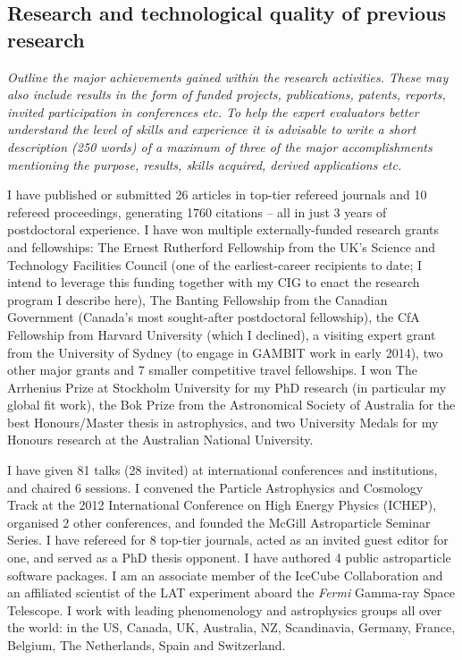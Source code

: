 \documentclass[a4paper,11pt]{article}
\newenvironment{xcomment}{\em}{}
\begin{document}
\subsection{Research and technological quality of previous research}

\begin{xcomment}
Outline the major achievements gained within the research
activities. These may also include results in the form of funded
projects, publications, patents, reports, invited participation in
conferences etc. To help the expert evaluators better understand the
level of skills and experience it is advisable to write a short
description (250 words) of a maximum of three of the major
accomplishments mentioning the purpose, results, skills acquired,
derived applications etc.
\end{xcomment}

I have published or submitted 26 articles in top-tier refereed journals and 10 refereed proceedings, generating 1760 citations -- all in just 3 years of postdoctoral experience.  I have won multiple externally-funded research grants and fellowships: The Ernest Rutherford Fellowship from the UK's Science and Technology Facilities Council (one of the earliest-career recipients to date; I intend to leverage this funding together with my CIG to enact the research program I describe here), The Banting Fellowship from the Canadian Government (Canada's most sought-after postdoctoral fellowship), the CfA Fellowship from Harvard University (which I declined), a visiting expert grant from the University of Sydney (to engage in GAMBIT work in early 2014), two other major grants and 7 smaller competitive travel fellowships. I won The Arrhenius Prize at Stockholm University for my PhD research (in particular my global fit work), the Bok Prize from the Astronomical Society of Australia for the best Honours/Master thesis in astrophysics, and two University Medals for my Honours research at the Australian National University.

I have given 81 talks (28 invited) at international conferences and institutions, and chaired 6 sessions. I convened the Particle Astrophysics and Cosmology Track at the 2012 International Conference on High Energy Physics (ICHEP), organised 2 other conferences, and founded the McGill Astroparticle Seminar Series. I have refereed for 8 top-tier journals, acted as an invited guest editor for one, and served as a PhD thesis opponent.  I have authored 4 public astroparticle software packages. I am an associate member of the IceCube Collaboration and an affiliated scientist of the LAT experiment aboard the \textit{Fermi} Gamma-ray Space Telescope. I work with leading phenomenology and astrophysics groups all over the world: in the US, Canada, UK, Australia, NZ, Scandinavia, Germany, France, Belgium, The Netherlands, Spain and Switzerland.
\end{document}
